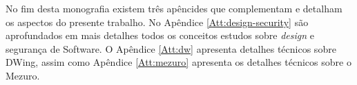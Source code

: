 No fim desta monografia existem três apêncides que complementam e detalham os aspectos do presente trabalho. No Apêndice \ref{Att:design-security} são aprofundados em mais detalhes todos os conceitos estudos sobre \emph{design} e segurança de Software. O Apêndice \ref{Att:dw} apresenta detalhes técnicos sobre DWing, assim como Apêndice \ref{Att:mezuro} apresenta os detalhes técnicos sobre o Mezuro.
